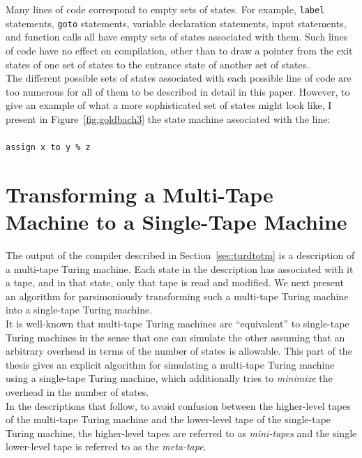 \documentclass[11pt]{report}
\begin{document}
Many lines of code correspond to empty sets of states. For example, \texttt{label} statements, \texttt{goto} statements, variable declaration statements, input statements, and function calls all have empty sets of states associated with them. Such lines of code have no effect on compilation, other than to draw a pointer from the exit states of one set of states to the entrance state of another set of states. \\

The different possible sets of states associated with each possible line of code are too numerous for all of them to be described in detail in this paper. However, to give an example of what a more sophisticated set of states might look like, I present in Figure~\ref{fig:goldbach3} the state machine associated with the line: \\ \\
\texttt{assign x to y \% z} \\

\section{Transforming a Multi-Tape Machine to a Single-Tape Machine \label{sec:mttost}}

The output of the compiler described in Section~\ref{sec:turdtotm} is a description of a multi-tape Turing machine. Each state in the description has associated with it a tape, and in that state, only that tape is read and modified. We next present an algorithm for parsimoniously transforming such a multi-tape Turing machine into a single-tape Turing machine. \\

It is well-known that multi-tape Turing machines are ``equivalent'' to single-tape Turing machines in the sense that one can simulate the other assuming that an arbitrary overhead in terms of the number of states is allowable. This part of the thesis gives an explicit algorithm for simulating a multi-tape Turing machine using a single-tape Turing machine, which additionally tries to \emph{minimize} the overhead in the number of states. \\

In the descriptions that follow, to avoid confusion between the higher-level tapes of the multi-tape Turing machine and the lower-level tape of the single-tape Turing machine, the higher-level tapes are referred to as \emph{mini-tapes} and the single lower-level tape is referred to as the \emph{meta-tape}. \\
\end{document}
